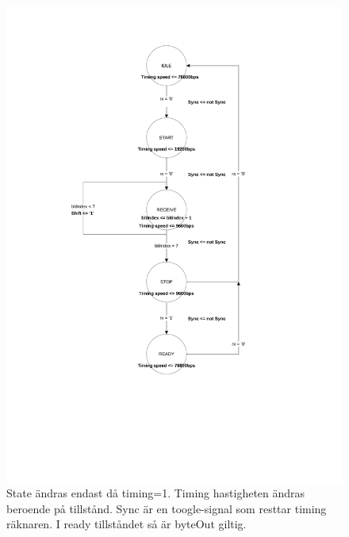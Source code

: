 \documentclass[a4paper]{scrartcl}
\begin{document}
		\begin{figure}[H]
			\centering
			\includegraphics[scale=0.6]{rxmachine.pdf}
			\caption{State ändras endast då timing=1. Timing hastigheten ändras beroende på tillstånd.  Sync är en toogle-signal som resttar timing räknaren. I ready tillståndet så är byteOut giltig.}
		\end{figure}
\end{document}
